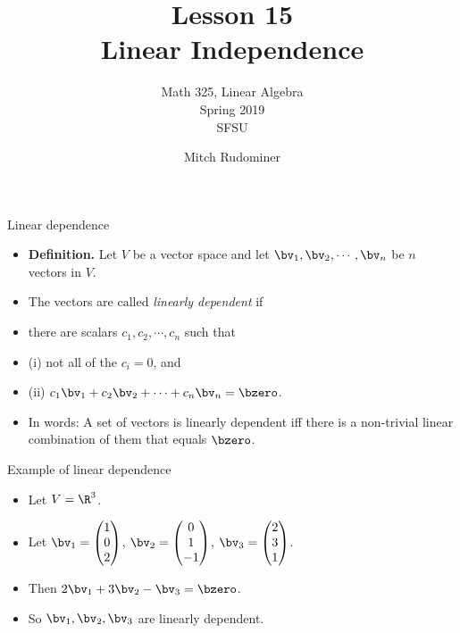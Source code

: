 \documentclass[handout]{beamer}
\title{Lesson 15 \\ Linear Independence}
\subtitle{Math 325, Linear Algebra \\ Spring 2019 \\ SFSU}
\author{Mitch Rudominer}
\date{}
\begin{document}
\begin{frame}
  \titlepage
\end{frame}


\begin{frame}{Linear dependence}

\begin{itemize}
\item \textbf{Definition.} Let $V$ be a vector space and let $\bv_1,\bv_2,\cdots,\bv_n$ be $n$ vectors in $V$.
\item The vectors are called \emph{linearly dependent} if
\item there are scalars $c_1,c_2,\cdots,c_n$ such that
\item (i) not all of the $c_i = 0$, and
\item (ii) $c_1 \bv_1 + c_2 \bv_2 + \cdots + c_n\bv_n = \bzero$.
\item In words: A set of vectors is linearly dependent iff there is a non-trivial linear combination
of them that equals $\bzero$.
\end{itemize}

\end{frame}

\begin{frame}{Example of linear dependence}

\begin{itemize}
\item Let $V = \R^3$.
\item Let $\bv_1 =
\begin{pmatrix}
1 \\ 0 \\ 2
\end{pmatrix}
$,
$\bv_2 =
\begin{pmatrix}
0 \\ 1 \\ -1
\end{pmatrix}
$,
$\bv_3 =
\begin{pmatrix}
2 \\ 3 \\ 1
\end{pmatrix}
$.

\item Then $2\bv_1+3\bv_2 - \bv_3 = \bzero$.
\item So $\bv_1, \bv_2, \bv_3$ are linearly dependent.
\end{itemize}

\end{frame}
\end{document}
